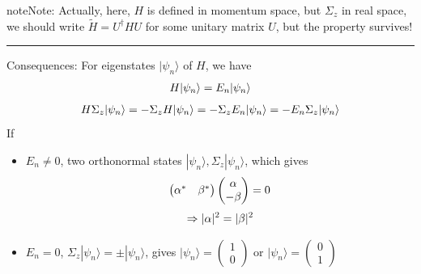 \documentclass[letterpaper,10pt,english]{sphinxmanual}
\begin{document}
\begin{notice}{note}{Note:}
Actually, here, \(H\) is defined in momentum space, but
\(\Sigma_z\) in real space, we should write
\(\tilde{H}=U^\dagger H U\) for some unitary matrix \(U\), but
the property survives!
\end{notice}


\bigskip\hrule{}\bigskip


Consequences: For eigenstates \(|\psi_n\rangle\) of \(H\), we
have
\begin{gather}
\begin{split}H|\psi_n\rangle=E_n|\psi_n\rangle\end{split}\notag
\end{gather}\begin{gather}
\begin{split}H\Sigma_z|\psi_n\rangle=-\Sigma_zH|\psi_n\rangle=-\Sigma_zE_n|\psi_n\rangle=-E_n\Sigma_z|\psi_n\rangle\end{split}\notag
\end{gather}
If
\begin{itemize}
\item {}
\(E_n\neq 0\), two orthonormal states
\(|\psi_n\rangle, \Sigma_z|\psi_n\rangle\), which gives
\begin{gather}
\begin{split}\begin{pmatrix}\alpha^* &\beta^*\end{pmatrix}\begin{pmatrix}\alpha\\-\beta\end{pmatrix}=0\end{split}\notag
\end{gather}\begin{gather}
\begin{split}\Rightarrow |\alpha|^2=|\beta|^2\end{split}\notag
\end{gather}
\item {}
\(E_n=0\), \(\Sigma_z|\psi_n\rangle=\pm|\psi_n\rangle\),
gives \(|\psi_n\rangle=\begin{pmatrix}1 \\0\end{pmatrix}\) or
\(|\psi_n\rangle=\begin{pmatrix}0 \\1\end{pmatrix}\)

\end{itemize}
\end{document}
